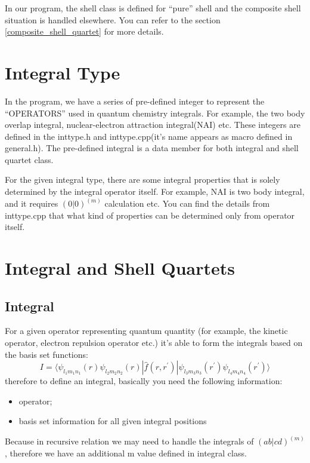 In our program, the shell class is defined for ``pure'' shell and 
the composite shell situation is handled elsewhere. You can refer
to the section \ref{composite_shell_quartet} for more details.

\section{Integral Type}
%
%
\label{inttype}

In the program, we have a series of pre-defined integer to represent 
the ``OPERATORS'' used in quantum chemistry integrals. For example,
the two body overlap integral, nuclear-electron attraction integral(NAI)
etc. These integers are defined in the inttype.h and inttype.cpp(it's 
name appears as macro defined in general.h). The pre-defined integral 
is a data member for both integral and shell quartet class.

For the given integral type, there are some integral properties that 
is solely determined by the integral operator itself. For example,
NAI is two body integral, and it requires $(0|0)^{(m)}$ calculation etc.
You can find the details from inttype.cpp that what kind of properties 
can be determined only from operator itself.

\section{Integral and Shell Quartets}
%
% 
%
\subsection{Integral}
\label{integral}
%
%
For a given operator representing quantum quantity (for example,
the kinetic operator, electron repulsion operator etc.) it's able 
to form the integrals based on the basis set functions:
\begin{equation}
 I = \langle \psi_{l_{1}m_{1}n_{1}}(r)\psi_{l_{2}m_{2}n_{2}}(r)| 
 \hat{f}(r,r^{'})| \psi_{l_{3}m_{3}n_{3}}(r^{'})
 \psi_{l_{4}m_{4}n_{4}}(r^{'})\rangle
\end{equation}
therefore to define an integral, basically you need the following
information:
\begin{itemize}
 \item operator;
 \item basis set information for all given integral positions
\end{itemize}
Because in recursive relation we may need to handle the integrals
of $(ab|cd)^{(m)}$, therefore we have an additional m value defined
in integral class.


